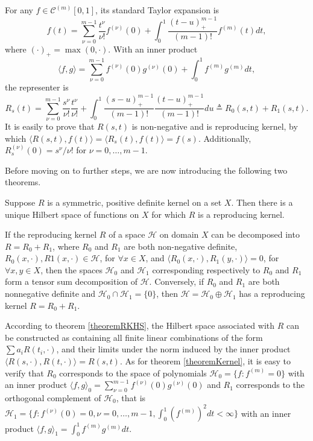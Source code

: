 For any $f\in \mathcal{C}^{(m)}[0,1]$, its standard Taylor expansion is  
\begin{equation}
f(t) = \sum_{\nu=0}^{m-1}\frac{t^\nu}{\nu!}f^{(\nu)}(0) + \int_{0}^{1}\frac{(t-u)_+^{m-1}}{(m-1)!}f^{(m)}(t)dt,
\end{equation}
where $(\cdot)_+ =\max(0, \cdot)$. With an inner product 
\begin{equation}
\langle f,g \rangle = \sum_{\nu=0}^{m-1}f^{(\nu)}(0)g^{(\nu)}(0) +  \int_{0}^{1}f^{(m)} g^{(m)}dt,
\end{equation}
the representer is 
\begin{equation}\label{GaussianProcessKernelR}
R_s(t) =\sum_{\nu=0}^{m-1} \frac{s^{\nu}}{\nu!} \frac{t^{\nu}}{\nu!} +\int_0^1\frac{ (s-u)_+^{m-1}}{(m-1)!} \frac{ (t-u)_+^{m-1}}{(m-1)!} du \triangleq R_0(s,t)+R_1(s,t). 
\end{equation}
It is easily to prove that $R(s,t)$ is non-negative and is reproducing kernel, by which $\langle R(s,t),f(t) \rangle = \langle R_s(t),f(t) \rangle=f(s)$. Additionally, $R_s^{(\nu)}(0) = s^\nu/\nu!$ for $\nu = 0,\ldots, m-1$.

Before moving on to further steps, we are now introducing the following two theorems. 
\begin{theorem}\cite{aronszajn1950theory}\label{theoremRKHS}
Suppose $R$ is a symmetric, positive definite kernel on a set $X$. Then there is a unique Hilbert space of functions on $X$ for which $R$ is a reproducing kernel. 
\end{theorem}
\begin{theorem}\cite{gu2013smoothing}\label{theoremKernel}
If the reproducing kernel $R$ of a space $\mathcal{H}$ on domain $X$ can
be decomposed into $R = R_0 + R_1$, where $R_0$ and $R_1$ are both non-negative definite, $R_0(x, \cdot),R1(x,\cdot) \in \mathcal{H}$, for $ \forall x \in X$, and $\langle R_0(x, \cdot),R_1(y, \cdot) \rangle= 0$, for $\forall x, y \in X$, then the spaces $\mathcal{H}_0$ and $\mathcal{H}_1$ corresponding respectively to $R_0$ and $R_1$ form a tensor sum decomposition of $\mathcal{H}$. Conversely, if $R_0$ and $R_1$ are both  nonnegative definite and $\mathcal{H}_0 \cap \mathcal{H}_1 =\{0\}$, then $\mathcal{H} =\mathcal{H}_0 \oplus \mathcal{H}_1$ has a reproducing kernel $R = R_0 + R_1$.
\end{theorem}

According to theorem \ref{theoremRKHS}, the Hilbert space associated with $R$ can be constructed as containing all finite linear combinations of the form $\sum a_iR(t_i,\cdot)$, and their limits under the norm induced by the inner product $\langle R(s,\cdot),R(t,\cdot) \rangle = R(s,t)$. As for theorem \ref{theoremKernel}, it is easy to verify that $R_0$ corresponds to the space of polynomials $\mathcal{H}_0 =\{f:f^{(m)}=0\}$ with an inner product $\langle f, g \rangle_0 = \sum_{\nu=0}^{m-1} f^{(\nu)}(0)g^{(\nu)}(0)$ and $R_1$ corresponds to the orthogonal complement of $\mathcal{H}_0$, that is $\mathcal{H}_1 =\{  f:f^{(\nu)}(0)=0,\nu = 0, \ldots,m-1, \int_{0}^{1}(f^{(m)})^2dt <\infty  \}$ with an inner product $\langle f, g\rangle_1 = \int_{0}^{1}f^{(m)}g^{(m)}dt $. 






